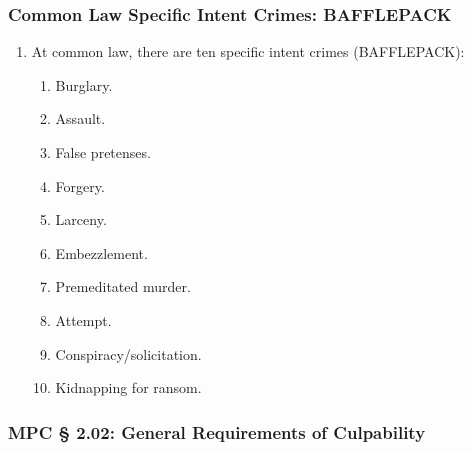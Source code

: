 \subsubsection{Common Law Specific Intent Crimes: BAFFLEPACK}

\begin{enumerate}
    \item At common law, there are ten specific intent crimes (BAFFLEPACK):
    \begin{enumerate}
        \item Burglary.
        \item Assault. 
        \item False pretenses.
        \item Forgery.
        \item Larceny.
        \item Embezzlement.
        \item Premeditated murder.
        \item Attempt.
        \item Conspiracy/solicitation.
        \item Kidnapping for ransom.
    \end{enumerate}
\end{enumerate}

\subsubsection{MPC § 2.02: General Requirements of Culpability}

